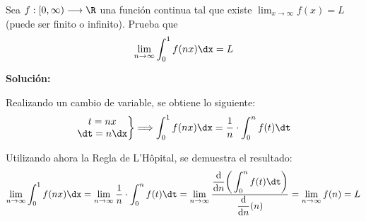 \documentclass[../../main.tex]{subfiles}
\begin{document}
  \begin{shaded}
    Sea $f: [0, \infty) \longrightarrow \R$ una función continua tal que existe $\displaystyle\lim_{x \to \infty} f(x) = L$ (puede ser finito o infinito). Prueba que
    $$
    \lim_{n \to \infty} \int_0^1 f(nx) \dx = L
    $$
  \end{shaded}

  \textbf{Solución:}

  Realizando un cambio de variable, se obtiene lo siguiente:
  $$
  \left .
    \begin{matrix}
      t = nx \\
      \dt = n \dx
    \end{matrix}
  \right \}
  \Longrightarrow
  \int_0^1 f(nx) \dx = \frac{1}{n} \cdot \int_0^n f(t) \dt
  $$

  Utilizando ahora la Regla de L'Hôpital, se demuestra el resultado:
  $$
  \lim_{n \to \infty} \int_0^1 f(nx) \dx = \lim_{n \to \infty} \frac{1}{n} \cdot \int_0^n f(t) \dt = \lim_{n \to \infty} \frac{\displaystyle\frac{\mathrm{d}}{\mathrm{d}n}\bigg(\displaystyle\int_0^n f(t) \dt\bigg)}{\displaystyle\frac{\mathrm{d}}{\mathrm{d}n}(n)} = \lim_{n \to \infty} f(n) = L
  $$
\end{document}
